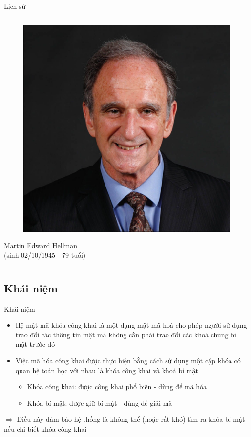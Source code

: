 \documentclass{beamer}
\numberwithin{equation}{section}
\begin{document}
\begin{frame}{Lịch sử}
\begin{columns}
\begin{column}{0.4\textwidth}
\begin{figure}[H]
\centering
\includegraphics[scale = 0.4]{pictures/Martin_Edward_Hellman.png}
\end{figure}
Martin Edward Hellman\\(sinh 02/10/1945 - 79 tuổi)
\end{column}

\end{columns}

\end{frame}
\subsection{Khái niệm}
\begin{frame}{Khái niệm}

\begin{itemize}
\item Hệ mật mã khóa công khai là một dạng mật mã hoá cho phép người sử dụng trao đổi các thông tin mật mà không cần phải trao đổi các khoá chung bí mật trước đó
\item Việc mã hóa công khai được thực hiện bằng cách sử dụng một cặp khóa có quan hệ toán học với nhau là khóa công khai và khoá bí mật
\begin{itemize}
\item Khóa công khai: được công khai phổ biến - dùng để mã hóa
\item Khóa bí mật: được giữ bí mật - dùng để giải mã
\end{itemize}
\end{itemize}

$\Rightarrow$ Điều này đảm bảo hệ thống là không thể (hoặc rất khó) tìm ra khóa bí mật nếu chỉ biết khóa công khai

\end{frame}
\end{document}
